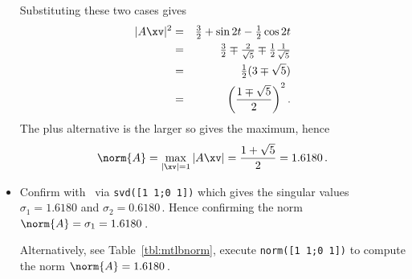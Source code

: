 \begin{example}
\begin{itemize}
Substituting these two cases gives
\begin{eqnarray*}
|A\xv|^2&=&\tfrac32+\sin 2t-\tfrac12\cos 2t
\\&=&\tfrac32\mp\tfrac2{\sqrt5}\mp\tfrac12\tfrac1{\sqrt5}
\\&=&\tfrac12(3\mp\sqrt5)
\\&=&\left(\frac{1\mp\sqrt5}2\right)^2.
\end{eqnarray*}
The plus alternative is the larger so gives the maximum, hence
\begin{equation*}
\norm{A}=\max_{|\xv|=1}|A\xv|=\frac{1+\sqrt5}2=1.6180\,.
\end{equation*}
\item Confirm with \script\ via \verb|svd([1 1;0 1])| which gives the singular values \(\sigma_1=1.6180\) and \(\sigma_2=0.6180\)\,.
Hence confirming the norm \(\norm{A}=\sigma_1=1.6180\)\,.

Alternatively, see Table~\ref{tbl:mtlbnorm}, execute \verb|norm([1 1;0 1])| to compute the norm \(\norm{A}=1.6180\)\,.
\end{itemize}
\end{example}




